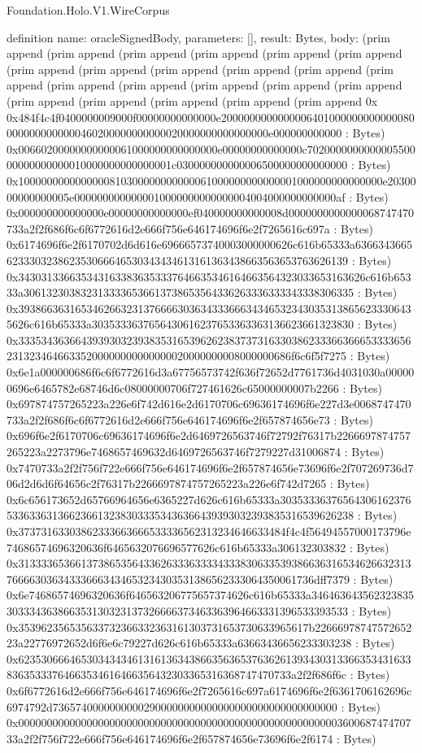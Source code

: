 \begin{lexlean}{Foundation.Holo.V1.WireCorpus}
\begin{semanticmodule}
definition{
  name: oracleSignedBody,
  parameters: [],
  result: Bytes,
  body: (prim append (prim append (prim append (prim append (prim append (prim append (prim append (prim append (prim append (prim append (prim append (prim append (prim append (prim append (prim append (prim append (prim append (prim append (prim append (prim append (prim append (prim append 0x 0x484f4c4f0400000009000f00000000000000e20000000000000064010000000000000800000000000000460200000000000020000000000000000e000000000000 : Bytes) 0x00660200000000000061000000000000000e00000000000000c702000000000000550000000000000010000000000000001c030000000000006500000000000000 : Bytes) 0x1000000000000000810300000000000061000000000000001000000000000000e2030000000000005e0000000000000010000000000000004004000000000000af : Bytes) 0x000000000000000e00000000000000ef040000000000008d0000000000000068747470733a2f2f686f6c6f6772616d2e666f756e646174696f6e2f7265616c697a : Bytes) 0x6174696f6e2f6170702d6d616e69666573740003000000626c616b65333a6366343665623330323862353066646530343434613161363438663563653763626139 : Bytes) 0x3430313366353431633836353337646635346164663564323033653163626c616b65333a3061323038323133336536613738653564336263336333343338306335 : Bytes) 0x3938663631653462663231376666303634333666343465323430353138656233306435626c616b65333a3035333637656430616237653363363136623661323830 : Bytes) 0x33353436366439393032393835316539626238373731633038623336636665333365623132346466335200000000000000020000000008000000686f6c6f5f7275 : Bytes) 0x6e1a000000686f6c6f6772616d3a67756573742f636f72652d7761736d4031030a000000696e6465782e68746d6c08000000706f727461626c65000000007b2266 : Bytes) 0x697874757265223a226e6f742d616e2d6170706c69636174696f6e227d3e0068747470733a2f2f686f6c6f6772616d2e666f756e646174696f6e2f657874656e73 : Bytes) 0x696f6e2f6170706c69636174696f6e2d6469726563746f72792f76317b2266697874757265223a2273796e7468657469632d6469726563746f7279227d31006874 : Bytes) 0x7470733a2f2f756f722e666f756e646174696f6e2f657874656e73696f6e2f707269736d706d2d6d6f64656c2f76317b2266697874757265223a226e6f742d7265 : Bytes) 0x6c656173652d65766964656e6365227d626c616b65333a303533363765643061623765336336313662366132383033353436366439393032393835316539626238 : Bytes) 0x37373163303862333663666533336562313234646633484f4c4f56494557000173796e74686574696320636f6465632076696577626c616b65333a306132303832 : Bytes) 0x313333653661373865356433626333633334333830633539386636316534626632313766663036343336663434653234303531386562333064350061736dff7379 : Bytes) 0x6e74686574696320636f646563206775657374626c616b65333a346463643562323835303334363866353130323137326666373463363964663331396533393533 : Bytes) 0x353962356535633732366332363161303731653730633965617b2266697874757265223a22776972652d6f6e6c79227d626c616b65333a63663436656233303238 : Bytes) 0x62353066646530343434613161363438663563653763626139343031336635343163383635333764663534616466356432303365316368747470733a2f2f686f6c : Bytes) 0x6f6772616d2e666f756e646174696f6e2f7265616c697a6174696f6e2f6361706162696c6974792d73657400000000002900000000000000000000000000000000 : Bytes) 0x00000000000000000000000000000000000000000000000000000000360068747470733a2f2f756f722e666f756e646174696f6e2f657874656e73696f6e2f6174 : Bytes) }
\end{semanticmodule}
\end{lexlean}
